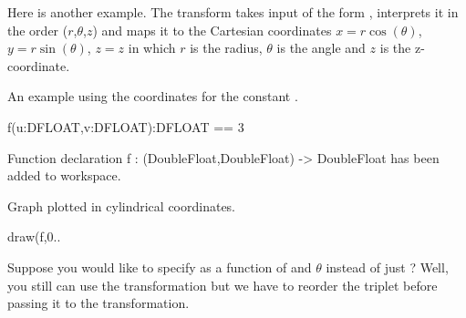 Here is another example.
The  transform takes
input of the form , interprets it in the order
($r$,$\theta$,$z$)
and maps it to the Cartesian coordinates
$x=r\cos(\theta)$, $y=r\sin(\theta)$, $z=z$
in which
$r$ is the radius,
$\theta$ is the angle and
$z$ is the z-coordinate.
\begin{xtc}
\begin{xtccomment}
An example using the 
coordinates for the constant .
\end{xtccomment}
\begin{spadsrc}
f(u:DFLOAT,v:DFLOAT):DFLOAT == 3 
\end{spadsrc}
\begin{MessageOutput}
   Function declaration f : (DoubleFloat,DoubleFloat) -> DoubleFloat 
      has been added to workspace.
\end{MessageOutput}
\end{xtc}
\begin{psXtc}
\begin{xtccomment}
Graph plotted in cylindrical coordinates.
\end{xtccomment}
\begin{spadsrc}
draw(f,0..%
\end{spadsrc}
\end{psXtc}

Suppose you would like to specify  as a function of
 and $\theta$ instead of just
?
Well, you still can use the  \Language{}
transformation but we have to reorder the triplet before
passing it to the transformation.

